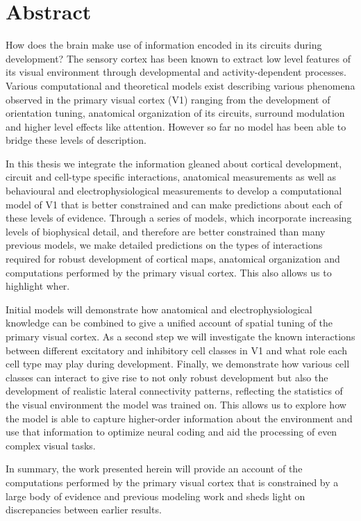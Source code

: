 
\begingroup
\let\clearpage\relax
\let\cleardoublepage\relax
\let\cleardoublepage\relax

\chapter*{Abstract} %

How does the brain make use of information encoded in its circuits
during development? The sensory cortex has been known to extract low
level features of its visual environment through developmental and
activity-dependent processes. Various computational and theoretical
models exist describing various phenomena observed in the primary
visual cortex (V1) ranging from the development of orientation tuning,
anatomical organization of its circuits, surround modulation and
higher level effects like attention. However so far no model has been
able to bridge these levels of description.

In this thesis we integrate the information gleaned about cortical
development, circuit and cell-type specific interactions, anatomical
measurements as well as behavioural and electrophysiological
measurements to develop a computational model of V1 that is better
constrained and can make predictions about each of these levels of
evidence. Through a series of models, which incorporate increasing
levels of biophysical detail, and therefore are better constrained than
many previous models, we make detailed predictions on the types of
interactions required for robust development of cortical maps,
anatomical organization and computations performed by the primary
visual cortex. This also allows us to highlight wher.

Initial models will demonstrate how anatomical and
electrophysiological knowledge can be combined to give a unified
account of spatial tuning of the primary visual cortex. As a second
step we will investigate the known interactions between different
excitatory and inhibitory cell classes in V1 and what role each cell
type may play during development. Finally, we demonstrate how various
cell classes can interact to give rise to not only robust development
but also the development of realistic lateral connectivity patterns,
reflecting the statistics of the visual environment the model was
trained on. This allows us to explore how the model is able to capture
higher-order information about the environment and use that
information to optimize neural coding and aid the processing of even
complex visual tasks. 

In summary, the work presented herein will provide an account of the
computations performed by the primary visual cortex that is
constrained by a large body of evidence and previous modeling work and
sheds light on discrepancies between earlier results.

\endgroup
